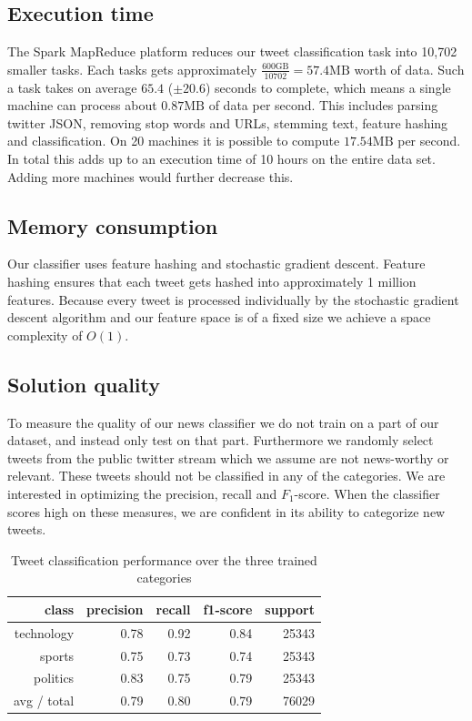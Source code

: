 \documentclass{llncs}
\begin{document}
\subsection{Execution time}
The Spark MapReduce platform reduces our tweet classification task into 10,702 smaller tasks. Each tasks gets approximately $\frac{600\text{GB}}{10702} = 57.4\text{MB}$ worth of data. Such a task takes on average $65.4$ ($\pm 20.6$) seconds to complete, which means a single machine can process about $0.87\text{MB}$ of data per second. This includes parsing twitter JSON, removing stop words and URLs, stemming text, feature hashing and classification. On 20 machines it is possible to compute $17.54\text{MB}$ per second. In total this adds up to an execution time of 10 hours on the entire data set. Adding more machines would further decrease this.

\subsection{Memory consumption}
Our classifier uses feature hashing and stochastic gradient descent. Feature hashing ensures that each tweet gets hashed into approximately 1 million features. Because every tweet is processed individually by the stochastic gradient descent algorithm and our feature space is of a fixed size we achieve a space complexity of $O(1)$.

\subsection{Solution quality}
To measure the quality of our news classifier we do not train on a part of our dataset, and instead only test on that part. Furthermore we randomly select tweets from the public twitter stream which we assume are not news-worthy or relevant. These tweets should not be classified in any of the categories. We are interested in optimizing the precision, recall and $F_1$-score. When the classifier scores high on these measures, we are confident in its ability to categorize new tweets.

\begin{table}[H]
	\begin{center}
		\begin{tabular}{|r|r|r|r|r|} \hline
			class  & precision   & recall & f1-score  & support \\ \hline
			technology    &   0.78 &     0.92  &    0.84   &  25343 \\
			sports   &    0.75   &   0.73   &   0.74   &   25343 \\
			politics   &    0.83  &    0.75   &   0.79   &   25343 \\
			avg / total  &     0.79   &   0.80  &    0.79   &  76029 \\ \hline
		\end{tabular}
	\end{center}
	\caption{Tweet classification performance over the three trained categories}
	\label{tbl:newclassifier}
\end{table}
\end{document}
